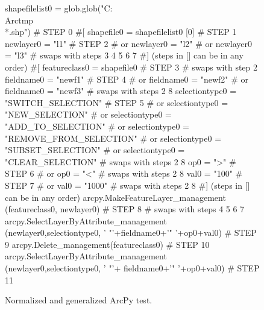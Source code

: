 \begin{figure}[t]
{\scriptsize 
\begin{code}
shapefilelist0 = 
   glob.glob("C:\\Arctmp\\*.shp")        \textcolor{black!60}{\# STEP 0}
\textcolor{black!60}{\#[}
shapefile0 = shapefilelist0 [0]        \textcolor{black!60}{\# STEP 1}
newlayer0 = "l1"                       \textcolor{black!60}{\# STEP 2}
\textcolor{black!60}{\#  or newlayer0 = "l2" }
\textcolor{black!60}{\#  or newlayer0 = "l3" }
\textcolor{black!60}{\#  swaps with steps 3 4 5 6 7}
\textcolor{black!60}{\#] (steps in [] can be in any order)}
\textcolor{black!60}{\#[}
featureclass0 = shapefile0             \textcolor{black!60}{\# STEP 3}
\textcolor{black!60}{\#  swaps with step 2}
fieldname0 = "newf1"                   \textcolor{black!60}{\# STEP 4}
\textcolor{black!60}{\#  or fieldname0 = "newf2" }
\textcolor{black!60}{\#  or fieldname0 = "newf3" }
\textcolor{black!60}{\#  swaps with steps 2 8}
selectiontype0 = "SWITCH\_SELECTION"    \textcolor{black!60}{\# STEP 5}
\textcolor{black!60}{\#  or selectiontype0 = "NEW\_SELECTION" }
\textcolor{black!60}{\#  or selectiontype0 = "ADD\_TO\_SELECTION" }
\textcolor{black!60}{\#  or selectiontype0 = "REMOVE\_FROM\_SELECTION"}
\textcolor{black!60}{\#  or selectiontype0 = "SUBSET\_SELECTION"}
\textcolor{black!60}{\#  or selectiontype0 = "CLEAR\_SELECTION"   }
\textcolor{black!60}{\#  swaps with steps 2 8}
op0 = ">"                              \textcolor{black!60}{\# STEP 6}
\textcolor{black!60}{\#  or op0 = "<" }
\textcolor{black!60}{\#  swaps with steps 2 8}
val0 = "100"                           \textcolor{black!60}{\# STEP 7}
\textcolor{black!60}{\#  or val0 = "1000" }
\textcolor{black!60}{\#  swaps with steps 2 8}
\textcolor{black!60}{\#] (steps in [] can be in any order)}
arcpy.MakeFeatureLayer\_management
   (featureclass0, newlayer0)          \textcolor{black!60}{\# STEP 8}
\textcolor{black!60}{\#  swaps with steps 4 5 6 7}
arcpy.SelectLayerByAttribute\_management
   (newlayer0,selectiontype0,
   ' "'+fieldname0+'" '+op0+val0)      \textcolor{black!60}{\# STEP 9}
arcpy.Delete\_management(featureclass0) \textcolor{black!60}{\# STEP 10}
arcpy.SelectLayerByAttribute\_management
   (newlayer0,selectiontype0,
   ' "'+ fieldname0+'" '+op0+val0)     \textcolor{black!60}{\# STEP 11}
\end{code}
}
\caption{Normalized and generalized ArcPy test.}
\label{esrinormgen}
\end{figure}